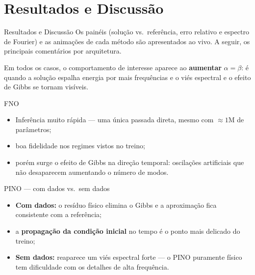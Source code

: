 \section{Resultados e Discussão}

\begin{frame}{Resultados e Discussão}
  Os painéis (solução vs.\ referência, erro relativo e espectro de Fourier) e as animações
  de cada método são apresentados \alert{ao vivo}. A seguir, os principais comentários por
  arquitetura.

  \vspace{0.3cm}
  \begin{information}
    Em todos os casos, o comportamento de interesse aparece ao \textbf{aumentar} $\alpha=\beta$:
    é quando a solução espalha energia por mais frequências e o \alert{viés espectral} e o
    \alert{efeito de Gibbs} se tornam visíveis.
  \end{information}
\end{frame}

\begin{frame}{FNO}
  \begin{itemize}
    \item Inferência \alert{muito rápida} --- uma única passada direta, mesmo com
          $\approx 1$M de parâmetros;
    \item boa fidelidade nos regimes vistos no treino;
    \item porém surge o \alert{efeito de Gibbs} na direção temporal: oscilações artificiais
          que não desaparecem aumentando o número de modos.
  \end{itemize}
\end{frame}

\begin{frame}{PINO --- com dados vs.\ sem dados}
  \begin{itemize}
    \item \textbf{Com dados:} o resíduo físico \alert{elimina o Gibbs} e a aproximação fica
          consistente com a referência;
    \item a \textbf{propagação da condição inicial} no tempo é o ponto mais delicado do
          treino;
    \item \textbf{Sem dados:} reaparece um \alert{viés espectral forte} --- o PINO puramente
          físico tem dificuldade com os detalhes de alta frequência.
  \end{itemize}
\end{frame}

